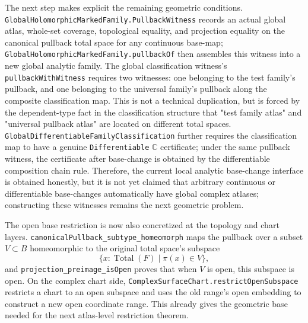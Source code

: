 \documentclass[UTF8,a4paper,11pt]{article}
\begin{document}
\par
The next step makes explicit the remaining geometric conditions.
\texttt{GlobalHolomorphic\allowbreak Marked\allowbreak Family\allowbreak.Pullback\allowbreak Witness} records an actual global atlas, whole-set coverage, topological equality, and projection equality on the canonical pullback total space for any continuous base-map;
\texttt{GlobalHolomorphic\allowbreak Marked\allowbreak Family\allowbreak.pullbackOf} then assembles this witness into a new global analytic family.
The global classification witness's \texttt{pullbackWithWitness} requires two witnesses: one belonging to the test family's pullback, and one belonging to the universal family's pullback along the composite classification map.
This is not a technical duplication, but is forced by the dependent-type fact in the classification structure that "test family atlas" and "universal pullback atlas" are located on different total spaces.
\texttt{GlobalDifferentiable\allowbreak Family\allowbreak Classification} further requires the classification map to have a genuine
\texttt{Differentiable\allowbreak} \(\mathbb C\) certificate; under the same pullback witness, the certificate after base-change is obtained by the differentiable composition chain rule.
Therefore, the current local analytic base-change interface is obtained honestly, but it is not yet claimed that arbitrary continuous or differentiable base-changes automatically have global complex atlases; constructing these witnesses remains the next geometric problem.
\par
The open base restriction is now also concretized at the topology and chart layers. \texttt{canonicalPullback\_subtype\_homeomorph} maps
the pullback over a subset \(V\subset B\) homeomorphic to the original total space's subspace
\[
  \{x:\operatorname{Total}(F)\mid \pi(x)\in V\},
\]
and \texttt{projection\_preimage\_isOpen} proves that when \(V\) is open, this subspace is open.
On the complex chart side, \texttt{ComplexSurfaceChart\allowbreak.restrictOpenSubspace} restricts a chart to an open subspace and uses the old range's open embedding to construct a new open coordinate range. This already gives the geometric base needed for the next atlas-level restriction theorem.



\end{document}
